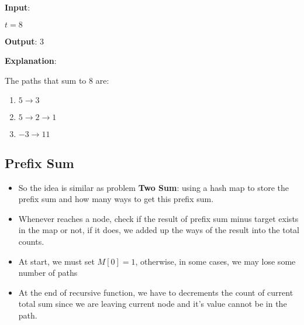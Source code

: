 \begin{flushleft}
\textbf{Input}:
\begin{figure}[H]
\end{figure}

$t = 8$

\textbf{Output}: 3


\textbf{Explanation}:

The paths that sum to 8 are:

\begin{enumerate}
\item $5 \longrightarrow 3$
\item $5 \longrightarrow 2 \longrightarrow 1$
\item $-3 \longrightarrow 11$
\end{enumerate}

\subsection{Prefix Sum}
\begin{itemize}
\item So the idea is similar as problem \textbf{Two Sum}: using a hash map to store the prefix sum and how many ways to get this prefix sum.
\item Whenever reaches a node, check if the result of prefix sum minus target exists in the map  or not, if it does, we added up the ways of the result into the total counts.
\item At start, we must set $M[0]=1$, otherwise, in some cases, we may lose some number of paths
\item At the end of recursive function, we have to decrements the count of current total sum since we are leaving current node and it's value cannot be in the path.
\end{itemize}

\end{flushleft}

